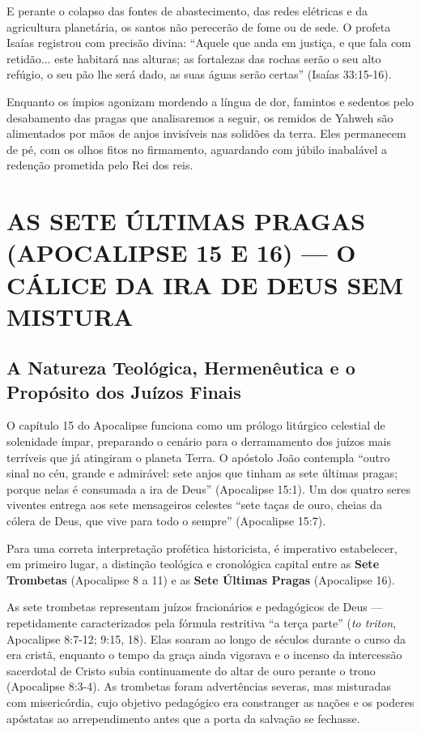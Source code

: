 E perante o colapso das fontes de abastecimento, das redes elétricas e da agricultura planetária, os santos não perecerão de fome ou de sede. O profeta Isaías registrou com precisão divina:
``Aquele que anda em justiça, e que fala com retidão... este habitará nas alturas; as fortalezas das rochas serão o seu alto refúgio, o seu pão lhe será dado, as suas águas serão certas'' (Isaías 33:15-16).

Enquanto os ímpios agonizam mordendo a língua de dor, famintos e sedentos pelo desabamento das pragas que analisaremos a seguir, os remidos de Yahweh são alimentados por mãos de anjos invisíveis nas solidões da terra. Eles permanecem de pé, com os olhos fitos no firmamento, aguardando com júbilo inabalável a redenção prometida pelo Rei dos reis.



\section{AS SETE ÚLTIMAS PRAGAS (APOCALIPSE 15 E 16) — O CÁLICE DA IRA DE DEUS SEM MISTURA}



\subsection{A Natureza Teológica, Hermenêutica e o Propósito dos Juízos Finais}


O capítulo 15 do Apocalipse funciona como um prólogo litúrgico celestial de solenidade ímpar, preparando o cenário para o derramamento dos juízos mais terríveis que já atingiram o planeta Terra. O apóstolo João contempla ``outro sinal no céu, grande e admirável: sete anjos que tinham as sete últimas pragas; porque nelas é consumada a ira de Deus'' (Apocalipse 15:1). Um dos quatro seres viventes entrega aos sete mensageiros celestes ``sete taças de ouro, cheias da cólera de Deus, que vive para todo o sempre'' (Apocalipse 15:7).

Para uma correta interpretação profética historicista, é imperativo estabelecer, em primeiro lugar, a distinção teológica e cronológica capital entre as \textbf{Sete Trombetas} (Apocalipse 8 a 11) e as \textbf{Sete Últimas Pragas} (Apocalipse 16).

As sete trombetas representam juízos fracionários e pedagógicos de Deus — repetidamente caracterizados pela fórmula restritiva ``a terça parte'' (\textit{to triton}, Apocalipse 8:7-12; 9:15, 18). Elas soaram ao longo de séculos durante o curso da era cristã, enquanto o tempo da graça ainda vigorava e o incenso da intercessão sacerdotal de Cristo subia continuamente do altar de ouro perante o trono (Apocalipse 8:3-4). As trombetas foram advertências severas, mas misturadas com misericórdia, cujo objetivo pedagógico era constranger as nações e os poderes apóstatas ao arrependimento antes que a porta da salvação se fechasse.

